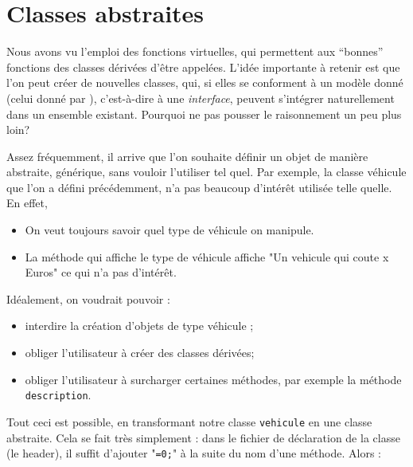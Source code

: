 
\section{Classes abstraites}

Nous avons vu l'emploi des fonctions virtuelles, qui permettent aux ``bonnes''
fonctions des classes d\'eriv\'ees d'\^etre appel\'ees. L'id\'ee importante \`a
retenir est que l'on peut cr\'eer de nouvelles classes, qui, si elles se
conforment \`a un mod\`ele donn\'e (celui donn\'e par ),
c'est-\`a-dire \`a une \emph{interface}, peuvent s'int\'egrer naturellement
dans un ensemble existant. Pourquoi ne pas pousser le raisonnement un peu plus
loin?

Assez fr\'equemment, il arrive que l'on souhaite d\'efinir un objet de
mani\`ere abstraite, g\'en\'erique, sans vouloir l'utiliser tel quel. Par
exemple, la classe v\'ehicule que l'on a d\'efini pr\'ec\'edemment, n'a pas
beaucoup d'int\'er\^et utilis\'ee telle quelle. En effet,

\begin{itemize}

	\item On veut toujours savoir quel type de v\'ehicule on manipule.

	\item La m\'ethode qui affiche le type de v\'ehicule affiche "Un
		vehicule qui coute x Euros" ce qui n'a pas
		d'int\'er\^et.

\end{itemize}

Id\'ealement, on voudrait pouvoir :
\begin{itemize}

	\item interdire la cr\'eation d'objets de type v\'ehicule ;

	\item obliger l'utilisateur \`a cr\'eer des classes d\'eriv\'ees;

	\item obliger l'utilisateur \`a surcharger certaines m\'ethodes, par
		exemple la m\'ethode \texttt{description}.

\end{itemize}

Tout ceci est possible, en transformant notre classe \texttt{vehicule} en une
classe abstraite. Cela se fait tr\`es simplement : dans le fichier de
d\'eclaration de la classe (le header), il suffit d'ajouter "\texttt{=0;}" \`a
la suite du nom d'une m\'ethode. Alors :


